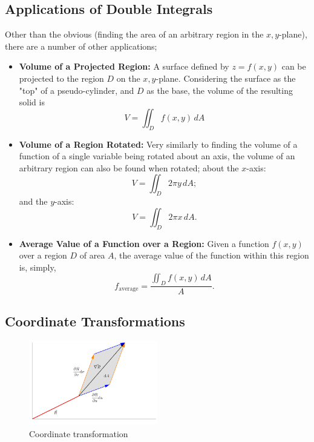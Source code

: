 \documentclass[12pt]{article}
\begin{document}
{\subsection{Applications of Double Integrals}

Other than the obvious (finding the area of an arbitrary region in the $x,y$-plane), there are a number of other applications;

\begin{itemize}
    \item \textbf{Volume of a Projected Region:} A surface defined by $z = f(x,y)$ can be projected to the region $D$ on the $x,y$-plane. Considering the surface as the "top" of a pseudo-cylinder, and $D$ as the base, the volume of the resulting solid is \[V = \iint_D f(x,y) \,dA\]
    \item \textbf{Volume of a Region Rotated:} Very similarly to finding the volume of a function of a single variable being rotated about an axis, the volume of an arbitrary region can also be found when rotated; about the $x$-axis: \[V = \iint_D 2\pi y \, dA;\] and the $y$-axis: \[V = \iint_D 2\pi x\, dA. \]
    \item \textbf{Average Value of a Function over a Region:} Given a function $f(x,y)$ over a region $D$ of area $A$, the average value of the function within this region is, simply, \[f_{\text{average}} = \frac{\iint_D f(x,y) \, dA}{A}.\]
\end{itemize}

\subsection{Coordinate Transformations}

\begin{figure}[!ht]
    \centering
    \includegraphics[width=0.5\textwidth]{./misc/transformationofvariables.png}
    \caption{Coordinate transformation}
    \label{fig:coordinate_transformations}
\end{figure}

}
\end{document}
